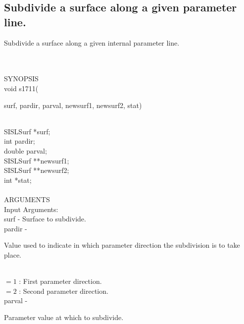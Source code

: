 \subsection{Subdivide a surface along a given parameter line.}
\begin{minipg1}
  Subdivide a surface along a given internal parameter line.
\end{minipg1} \\ \\
SYNOPSIS\\
        \>void s1711(\begin{minipg3}
        {\fov surf}, {\fov pardir}, {\fov parval}, {\fov newsurf1}, {\fov newsurf2}, {\fov stat})
                \end{minipg3}\\[0.3ex]
                \>\>    SISLSurf        \>      *{\fov surf};\\
                \>\>    int     \>      {\fov pardir};\\
                \>\>    double  \>      {\fov parval};\\
                \>\>    SISLSurf        \>      **{\fov newsurf1};\\
                \>\>    SISLSurf        \>      **{\fov newsurf2};\\
                \>\>    int     \>      *{\fov stat};\\
\\
ARGUMENTS\\
        \>Input Arguments:\\
        \>\>    {\fov surf}     \> - \> Surface to subdivide.\\
        \>\>    {\fov pardir}   \> - \> \begin{minipg2}
                                Value used to indicate in which
                                parameter direction the subdivision is to take place.
                                \end{minipg2}\\[0.8ex]
                \>\>\>\>\>      $= 1$\> : First parameter direction.\\
                \>\>\>\>\>      $= 2$\> : Second parameter direction.\\
        \>\>    {\fov parval}   \> - \> \begin{minipg2}
                                Parameter value at which to subdivide.
                                \end{minipg2}\\
